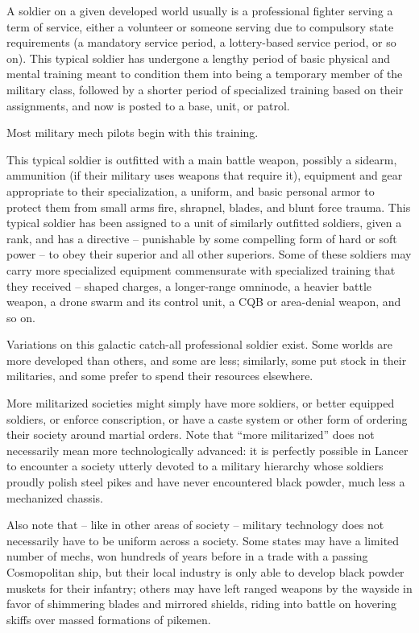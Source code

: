 A soldier on a given developed world usually is a professional fighter serving a term of service,
either a volunteer or someone serving due to compulsory state requirements (a mandatory
service period, a lottery-based service period, or so on). This typical soldier has undergone a
lengthy period of basic physical and mental training meant to condition them into being a
temporary member of the military class, followed by a shorter period of specialized training
based on their assignments, and now is posted to a base, unit, or patrol.


Most military mech pilots begin with this training.





This typical soldier is outfitted with a main battle weapon, possibly a sidearm, ammunition (if their
military uses weapons that require it), equipment and gear appropriate to their specialization, a
uniform, and basic personal armor to protect them from small arms fire, shrapnel, blades, and
blunt force trauma. This typical soldier has been assigned to a unit of similarly outfitted soldiers,
given a rank, and has a directive -- punishable by some compelling form of hard or soft power --
to obey their superior and all other superiors. Some of these soldiers may carry more specialized
equipment commensurate with specialized training that they received -- shaped charges, a
longer-range omninode, a heavier battle weapon, a drone swarm and its control unit, a CQB or
area-denial weapon, and so on.


Variations on this galactic catch-all professional soldier exist. Some worlds are more developed
than others, and some are less; similarly, some put stock in their militaries, and some prefer to
spend their resources elsewhere.


More militarized societies might simply have more soldiers, or better equipped soldiers, or
enforce conscription, or have a caste system or other form of ordering their society around
martial orders. Note that “more militarized” does not necessarily mean more technologically
advanced: it is perfectly possible in Lancer to encounter a society utterly devoted to a military
hierarchy whose soldiers proudly polish steel pikes and have never encountered black powder,
much less a mechanized chassis.


Also note that -- like in other areas of society -- military technology does not necessarily have to
be uniform across a society. Some states may have a limited number of mechs, won hundreds of
years before in a trade with a passing Cosmopolitan ship, but their local industry is only able to
develop black powder muskets for their infantry; others may have left ranged weapons by the
wayside in favor of shimmering blades and mirrored shields, riding into battle on hovering skiffs
over massed formations of pikemen.


